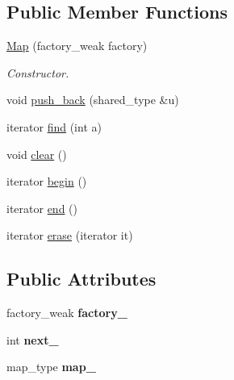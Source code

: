 \subsection*{\-Public \-Member \-Functions}
\begin{DoxyCompactItemize}
\item 
\hypertarget{classNeb_1_1Map_a7e15e6246362cebda8a9fbf6e4fdfff2}{\hyperlink{classNeb_1_1Map_a7e15e6246362cebda8a9fbf6e4fdfff2}{\-Map} (factory\-\_\-weak factory)}\label{classNeb_1_1Map_a7e15e6246362cebda8a9fbf6e4fdfff2}

\begin{DoxyCompactList}\small\item\em \-Constructor. \end{DoxyCompactList}\item 
void \hyperlink{classNeb_1_1Map_a628b2826bd845181f8fdec7de0255aff}{push\-\_\-back} (shared\-\_\-type \&u)
\item 
iterator \hyperlink{classNeb_1_1Map_a3e040f5d07053dbdc8853e242f633142}{find} (int a)
\item 
void \hyperlink{classNeb_1_1Map_ae0fedef74480d411f5b35583927e237c}{clear} ()
\item 
iterator \hyperlink{classNeb_1_1Map_aaa7f3f7057179fef6a38559258a217b4}{begin} ()
\item 
iterator \hyperlink{classNeb_1_1Map_abd67f06c1909b3cb1982d7637c7a3877}{end} ()
\item 
iterator \hyperlink{classNeb_1_1Map_a0d5ff20f0bce0ca3a55ed0d204d138bb}{erase} (iterator it)
\end{DoxyCompactItemize}
\subsection*{\-Public \-Attributes}
\begin{DoxyCompactItemize}
\item 
\hypertarget{classNeb_1_1Map_a7291ffc371a2419502e1765c8a78c14f}{factory\-\_\-weak {\bfseries factory\-\_\-}}\label{classNeb_1_1Map_a7291ffc371a2419502e1765c8a78c14f}

\item 
\hypertarget{classNeb_1_1Map_a8b62fd79e9fc42a74a72f22c21a932ba}{int {\bfseries next\-\_\-}}\label{classNeb_1_1Map_a8b62fd79e9fc42a74a72f22c21a932ba}

\item 
\hypertarget{classNeb_1_1Map_a90e63f3ea00d82d366192f092cdb5fa9}{map\-\_\-type {\bfseries map\-\_\-}}\label{classNeb_1_1Map_a90e63f3ea00d82d366192f092cdb5fa9}

\end{DoxyCompactItemize}
